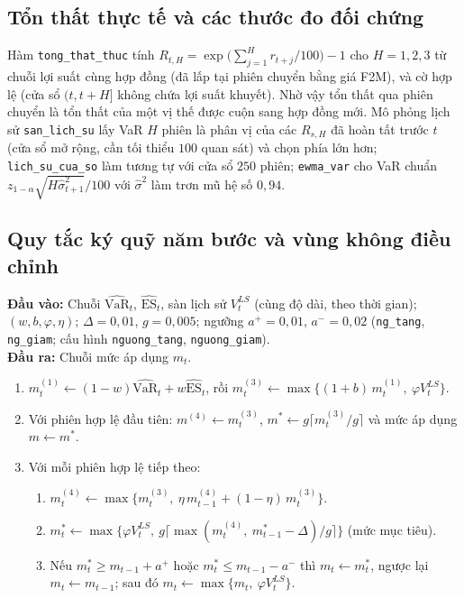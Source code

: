 \documentclass[12pt,a4paper]{article}
\newcounter{thuattoan}
\newenvironment{thuattoan}[1]{%
  \refstepcounter{thuattoan}%
  \begin{tcolorbox}[enhanced,breakable,colback=nenkhung,colframe=vienkhung,boxrule=0.5pt,arc=1mm,
    left=6pt,right=6pt,top=4pt,bottom=4pt,
    title={\textbf{Thuật toán \thethuattoan.} #1},coltitle=black,colbacktitle=nenkhung!60!vienkhung!25]%
  \small
}{\end{tcolorbox}}
\theoremstyle{remark}
\newcommand{\VaR}{\mathrm{VaR}}
\newcommand{\ES}{\mathrm{ES}}
\newcommand{\ma}[1]{\texttt{\small #1}}
\begin{document}
\subsection{Tổn thất thực tế và các thước đo đối chứng}

Hàm \ma{tong\_that\_thuc} tính $R_{t,H}=\exp\big(\sum_{j=1}^{H}r_{t+j}/100\big)-1$ cho $H=1,2,3$ từ chuỗi lợi suất cùng hợp đồng (đã lấp tại phiên chuyển bằng giá F2M), và cờ hợp lệ (cửa sổ $(t,t+H]$ không chứa lợi suất khuyết). Nhờ vậy tổn thất qua phiên chuyển là tổn thất của một vị thế được cuộn sang hợp đồng mới. Mô phỏng lịch sử \ma{san\_lich\_su} lấy VaR $H$ phiên là phân vị của các $R_{s,H}$ đã hoàn tất trước $t$ (cửa sổ mở rộng, cần tối thiểu $100$ quan sát) và chọn phía lớn hơn; \ma{lich\_su\_cua\_so} làm tương tự với cửa sổ $250$ phiên; \ma{ewma\_var} cho VaR chuẩn $z_{1-\alpha}\sqrt{H\hat\sigma_{t+1}^2}/100$ với $\hat\sigma^2$ làm trơn mũ hệ số $0{,}94$.

\subsection{Quy tắc ký quỹ năm bước và vùng không điều chỉnh}

\begin{thuattoan}{Quy tắc ký quỹ (hàm \ma{quy\_tac})}
\textbf{Đầu vào:} Chuỗi $\widehat{\VaR}_t$, $\widehat{\ES}_t$, sàn lịch sử $V^{LS}_t$ (cùng độ dài, theo thời gian); $(w,b,\varphi,\eta)$; $\Delta=0{,}01$, $g=0{,}005$; ngưỡng $a^{+}=0{,}01$, $a^{-}=0{,}02$ (\ma{ng\_tang}, \ma{ng\_giam}; cấu hình \ma{nguong\_tang}, \ma{nguong\_giam}).\\
\textbf{Đầu ra:} Chuỗi mức áp dụng $m_t$.
\begin{enumerate}
\item $m^{(1)}_t\leftarrow(1-w)\widehat{\VaR}_t+w\widehat{\ES}_t$, rồi $m^{(3)}_t\leftarrow\max\{(1+b)\,m^{(1)}_t,\ \varphi V^{LS}_t\}$.
\item Với phiên hợp lệ đầu tiên: $m^{(4)}\leftarrow m^{(3)}_t$, $m^{\ast}\leftarrow g\lceil m^{(3)}_t/g\rceil$ và mức áp dụng $m\leftarrow m^{\ast}$.
\item Với mỗi phiên hợp lệ tiếp theo:
 \begin{enumerate}
 \item $m^{(4)}_t\leftarrow\max\{m^{(3)}_t,\ \eta\,m^{(4)}_{t-1}+(1-\eta)\,m^{(3)}_t\}$.
 \item $m^{\ast}_t\leftarrow\max\big\{\varphi V^{LS}_t,\ g\lceil\max(m^{(4)}_t,\ m^{\ast}_{t-1}-\Delta)/g\rceil\big\}$ (mức mục tiêu).
 \item Nếu $m^{\ast}_t\ge m_{t-1}+a^{+}$ hoặc $m^{\ast}_t\le m_{t-1}-a^{-}$ thì $m_t\leftarrow m^{\ast}_t$, ngược lại $m_t\leftarrow m_{t-1}$; sau đó $m_t\leftarrow\max\{m_t,\ \varphi V^{LS}_t\}$.
 \end{enumerate}
\end{enumerate}
\end{thuattoan}
\end{document}
